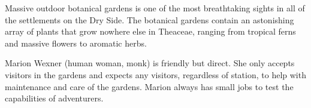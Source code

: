 Massive outdoor botanical gardens is one of the most breathtaking sights in all of the settlements on the Dry Side.
The botanical gardens contain an astonishing array of plants that grow nowhere else in Theaceae, ranging from tropical ferns and massive flowers to aromatic herbs.

Marion Wexner (human woman, monk) is friendly but direct.
She only accepts visitors in the gardens and expects any visitors, regardless of station, to help with maintenance and care of the gardens.
Marion always has small jobs to test the capabilities of adventurers.
